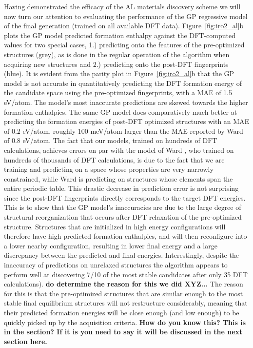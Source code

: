 Having demonstrated the efficacy of the AL materials discovery scheme we will now turn our attention to evaluating the performance of the GP regressive model of the final generation (trained on all available \IrOthree DFT data).
%
Figure~\ref{fig:iro2_al}b plots the GP model predicted formation enthalpy against the DFT-computed values for two special cases,
1.) predicting onto the features of the pre-optimized structures (grey), as is done in the regular operation of the algorithm when acquiring new structures and
2.) predicting onto the post-DFT fingerprints (blue).
%
It is evident from the parity plot in Figure~\ref{fig:iro2_al}b that the GP model is not accurate in quantitatively predicting the DFT formation energy of the candidate space using the pre-optimized fingerprints,
with a MAE of \mytilde\num{1.5} eV/atom.
%
The model's most inaccurate predictions are skewed towards the higher formation enthalpies.
%
The same GP model does comparatively much better at predicting the formation energies of post-DFT optimized structures with an MAE of \mytilde\num{0.2} eV/atom,
roughly 100 meV/atom larger than the MAE reported by Ward  of 0.8 eV/atom.
%
The fact that our models, trained on hundreds of DFT calculations,  achieves errors on par with the model of Ward , who trained on hundreds of thousands of DFT calculations, is due to the fact that we are training and predicting on a space whose properties are very narrowly constrained, while Ward  is predicting on structures whose elements span the entire periodic table.
%
This drastic decrease in prediction error is not surprising since the post-DFT fingerprints directly corresponds to the target DFT energies.
%
This is to show that the GP model's inaccuracies are due to the large degree of structural reorganization that occurs after DFT relaxation of the pre-optimized structure.
%
Structures that are initialized in high energy configurations will therefore have high predicted formation enthalpies, and will then reconfigure into a lower nearby configuration, resulting in lower final energy and a large discrepancy between the predicted and final energies.
%
Interestingly, despite the inaccuracy of predictions on unrelaxed structures the algorithm appears to perform well at discovering \num{7/10} of the most stable candidates after only \num{35} DFT calculations). \textbf{do determine the reason for this we did XYZ...}
%
The reason for this is that the pre-optimized structures that are similar enough to the most stable final equilibrium structures will not restructure considerably, meaning that their predicted formation energies will be close enough (and low enough) to be quickly picked up by the acquisition criteria. \textbf{How do you know this?  This is in the section?  If it is you need to say it will be discussed in the next section here.}
%


